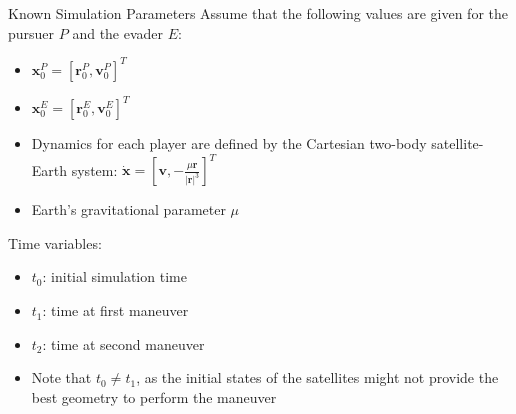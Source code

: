 \begin{frame}{Known Simulation Parameters}
    Assume that the following values are given for the pursuer $P$ and the evader $E$: 

    \begin{itemize}
        \item $\boldsymbol{x}^P_0 = [\boldsymbol{r}^P_0, \boldsymbol{v}^P_0]^T$ 
        \item $\boldsymbol{x}^E_0 = [\boldsymbol{r}^E_0, \boldsymbol{v}^E_0]^T$
        \item Dynamics for each player are defined by the Cartesian two-body satellite-Earth system: $\dot{\boldsymbol{x}} = [\boldsymbol{v}, -\frac{\mu \boldsymbol{r}}{|\boldsymbol{r}|^3}]^T$
        \item Earth's gravitational parameter $\mu$
    \end{itemize}

    Time variables: 
    \begin{itemize}
        \item $t_0$: initial simulation time
        \item $t_1$: time at first maneuver
        \item $t_2$: time at second maneuver
        \item Note that $t_0 \neq t_1$, as the initial states of the satellites might not provide the best geometry to perform the maneuver
    \end{itemize}
    
\end{frame}



